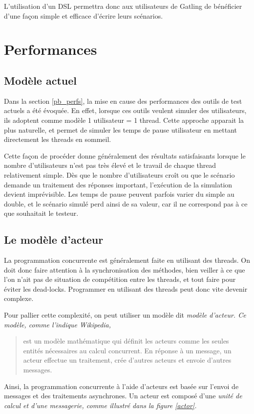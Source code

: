 L'utilisation d'un DSL permettra donc aux utilisateurs de Gatling de bénéficier d'une façon simple et efficace d'écrire leurs scénarios.

\section{Performances}
\subsection{Modèle actuel}
Dans la section \ref{pb_perfs}, la mise en cause des performances des outils de test actuels a été évoquée. En effet, lorsque ces outils veulent simuler des utilisateurs, ils adoptent comme modèle 1 utilisateur = 1 thread. Cette approche apparait la plus naturelle, et permet de simuler les temps de pause utilisateur en mettant directement les threads en sommeil.

Cette façon de procéder donne généralement des résultats satisfaisants lorsque le nombre d'utilisateurs n'est pas très élevé et le travail de chaque thread relativement simple. Dès que le nombre d'utilisateurs croît ou que le scénario demande un traitement des réponses important, l'exécution de la simulation devient imprévisible. Les temps de pause peuvent parfois varier du simple au double, et le scénario simulé perd ainsi de sa valeur, car il ne correspond pas à ce que souhaitait le testeur. 

\subsection{Le modèle d'acteur}
\label{sec_acteurs}
La programmation concurrente est généralement faite en utilisant des threads. On doit donc faire attention à la synchronisation des méthodes, bien veiller à ce que l'on n'ait pas de situation de compétition entre les threads, et tout faire pour éviter les dead-locks. Programmer en utilisant des threads peut donc vite devenir complexe.

Pour pallier cette complexité, on peut utiliser un modèle dit \em{modèle d'acteur}. Ce modèle, comme l'indique Wikipedia\cite{actor_model}, \begin{quote}est un modèle mathématique qui définit les acteurs comme les seules entités nécessaires au calcul concurrent. En réponse à un message, un acteur effectue un traitement, crée d'autres acteurs et envoie d'autres messages.\end{quote}

Ainsi, la programmation concurrente à l'aide d'acteurs est basée sur l'envoi de messages et des traitements asynchrones. Un acteur est composé d'une \em{unité de calcul} et d'une \em{messagerie}, comme illustré dans la figure \ref{actor}.

